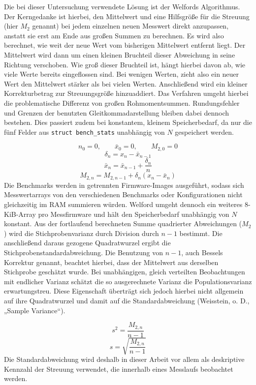 Die bei dieser Untersuchung verwendete Lösung ist der Welfords Algorithmus. Der Kerngedanke ist hierbei, den Mittelwert und eine Hilfsgröße für die Streuung (hier \(M_2\) genannt) bei jedem einzelnen neuen Messwert direkt anzupassen, anstatt sie erst am Ende aus großen Summen zu berechnen. Es wird also berechnet, wie weit der neue Wert vom bisherigen Mittelwert entfernt liegt. Der Mittelwert wird dann um einen kleinen Bruchteil dieser Abweichung in seine Richtung verschoben. Wie groß dieser Bruchteil ist, hängt hierbei davon ab, wie viele Werte bereits eingeflossen sind. Bei wenigen Werten, zieht also ein neuer Wert den Mittelwert stärker als bei vielen Werten. Anschließend wird ein kleiner Korrekturbetrag zur Streuungsgröße hinzuaddiert. Das Verfahren umgeht hierbei die problematische Differenz von großen Rohmomentsummen. Rundungsfehler und Grenzen der benutzten Gleitkommadarstellung bleiben dabei dennoch bestehen. Dies passiert zudem bei konstantem, kleinem Speicherbedarf, da nur die fünf Felder aus \lstinline[style=fileinline]|struct bench_stats| unabhängig von \(N\) gespeichert werden.

\[n_0 = 0, \qquad \bar{x}_0 = 0, \qquad M_{2,0} = 0\]
\[\delta_n = x_n - \bar{x}_{n-1}\]
\[\bar{x}_n = \bar{x}_{n-1} + \frac{\delta_n}{n}\]
\[M_{2,n} = M_{2,n-1} + \delta_n \left(x_n - \bar{x}_n\right)\]
Die Benchmarks werden in getrennten Firmware-Images ausgeführt, sodass sich Messwertarrays von den verschiedenen Benchmarks oder Konfigurationen nicht gleichzeitig im RAM summieren würden. Welford umgeht dennoch ein weiteres 8-KiB-Array pro Messfirmware und hält den Speicherbedarf unabhängig von \(N\) konstant. Aus der fortlaufend berechneten Summe quadrierter Abweichungen (\(M_2\)) wird die Stichprobenvarianz durch Division durch \(n-1\) bestimmt. Die anschließend daraus gezogene Quadratwurzel ergibt die Stichprobenstandardabweichung. Die Benutzung von \(n-1\), auch Bessels Korrektur genannt, beachtet hierbei, dass der Mittelwert aus derselben Stichprobe geschätzt wurde. Bei unabhängigen, gleich verteilten Beobachtungen mit endlicher Varianz schätzt die so ausgerechnete Varianz die Populationsvarianz erwartungstreu. Diese Eigenschaft überträgt sich jedoch hierbei nicht allgemein auf ihre Quadratwurzel und damit auf die Standardabweichung (Weisstein, o. D., „Sample Variance“).

\[s^2 = \frac{M_{2,n}}{n-1}\]
\[s = \sqrt{\frac{M_{2,n}}{n-1}}\]
Die Standardabweichung wird deshalb in dieser Arbeit vor allem als deskriptive Kennzahl der Streuung verwendet, die innerhalb eines Messlaufs beobachtet werden.


